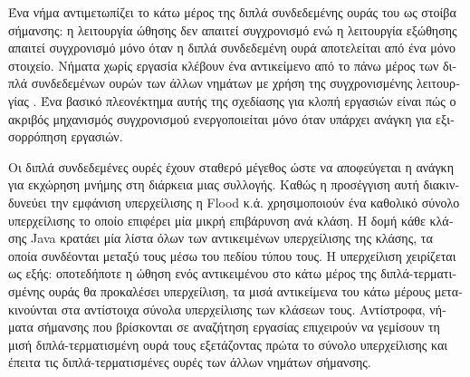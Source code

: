 \begin{greek}
Ένα νήμα αντιμετωπίζει το κάτω μέρος της διπλά συνδεδεμένης ουράς
του ως στοίβα σήμανσης: η λειτουργία ώθησης δεν απαιτεί συγχρονισμό
ενώ η λειτουργία εξώθησης απαιτεί συγχρονισμό μόνο όταν η διπλά
συνδεδεμένη ουρά αποτελείται από ένα μόνο στοιχείο. Νήματα χωρίς
εργασία κλέβουν ένα αντικείμενο από το πάνω μέρος των διπλά συνδεδεμένων
ουρών των άλλων νημάτων με χρήση της συγχρονισμένης λειτουργίας
\textenglish{}. Ένα βασικό πλεονέκτημα αυτής της σχεδίασης
για κλοπή εργασιών είναι πώς ο ακριβός μηχανισμός συγχρονισμού
ενεργοποιείται μόνο όταν υπάρχει ανάγκη για εξισορρόπηση εργασιών.

Οι διπλά συνδεδεμένες ουρές έχουν σταθερό μέγεθος ώστε να αποφεύγεται
η ανάγκη για εκχώρηση μνήμης στη διάρκεια μιας συλλογής. Καθώς
η προσέγγιση αυτή διακινδυνεύει την εμφάνιση υπερχείλισης η
Flood κ.ά. χρησιμοποιούν ένα καθολικό σύνολο υπερχείλισης το
οποίο επιφέρει μία μικρή επιβάρυνση ανά κλάση. Η δομή κάθε
κλάσης Java κρατάει μία λίστα όλων των αντικειμένων υπερχείλισης
της κλάσης, τα οποία συνδέονται μεταξύ τους μέσω του πεδίου
τύπου τους. Η υπερχείλιση χειρίζεται ως εξής: οποτεδήποτε η
ώθηση ενός αντικειμένου στο κάτω μέρος της διπλά-τερματισμένης
ουράς θα προκαλέσει υπερχείλιση, τα μισά αντικείμενα του κάτω
μέρους μετακινούνται στα αντίστοιχα σύνολα υπερχείλισης των
κλάσεων τους. Αντίστροφα, νήματα σήμανσης που βρίσκονται σε
αναζήτηση εργασίας επιχειρούν να γεμίσουν τη μισή διπλά-τερματισμένη
ουρά τους εξετάζοντας πρώτα το σύνολο υπερχείλισης και έπειτα
τις διπλά-τερματισμένες ουρές των άλλων νημάτων σήμανσης.


\end{greek}
